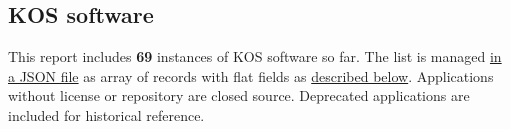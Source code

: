 \documentclass[
  DIV=10]{article}
\begin{document}
\newpage
{}
\recalctypearea

\subsection{KOS software}\label{kos-software}

This report includes \textbf{69} instances of KOS software so far. The
list is managed \href{kos-software.json}{in a JSON file} as array of
records with flat fields as \hyperref[metadata]{described below}.
Applications without license or repository are closed source. Deprecated
applications are included for historical reference.

\begin{longtable}[]{@{}lllllllll@{}}

\caption{\label{tbl-software}}

\tabularnewline


\end{longtable}
\end{document}
